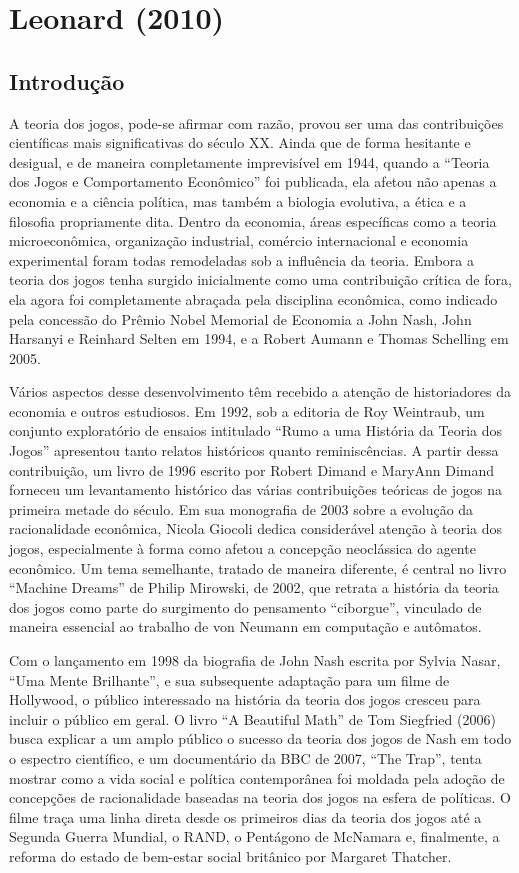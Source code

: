 \documentclass[a4paper,12pt]{article}[abntex2]
\begin{document}
\section{\textbf{Leonard (2010)}}

\subsection{\textbf{Introdução}}
A teoria dos jogos, pode-se afirmar com razão, provou ser uma das contribuições científicas mais significativas do século XX. Ainda que de forma hesitante e desigual, e de maneira completamente imprevisível em 1944, quando a “Teoria dos Jogos e Comportamento Econômico” foi publicada, ela afetou não apenas a economia e a ciência política, mas também a biologia evolutiva, a ética e a filosofia propriamente dita. Dentro da economia, áreas específicas como a teoria microeconômica, organização industrial, comércio internacional e economia experimental foram todas remodeladas sob a influência da teoria. Embora a teoria dos jogos tenha surgido inicialmente como uma contribuição crítica de fora, ela agora foi completamente abraçada pela disciplina econômica, como indicado pela concessão do Prêmio Nobel Memorial de Economia a John Nash, John Harsanyi e Reinhard Selten em 1994, e a Robert Aumann e Thomas Schelling em 2005.

Vários aspectos desse desenvolvimento têm recebido a atenção de historiadores da economia e outros estudiosos. Em 1992, sob a editoria de Roy Weintraub, um conjunto exploratório de ensaios intitulado “Rumo a uma História da Teoria dos Jogos” apresentou tanto relatos históricos quanto reminiscências. A partir dessa contribuição, um livro de 1996 escrito por Robert Dimand e MaryAnn Dimand forneceu um levantamento histórico das várias contribuições teóricas de jogos na primeira metade do século. Em sua monografia de 2003 sobre a evolução da racionalidade econômica, Nicola Giocoli dedica considerável atenção à teoria dos jogos, especialmente à forma como afetou a concepção neoclássica do agente econômico. Um tema semelhante, tratado de maneira diferente, é central no livro “Machine Dreams” de Philip Mirowski, de 2002, que retrata a história da teoria dos jogos como parte do surgimento do pensamento “ciborgue”, vinculado de maneira essencial ao trabalho de von Neumann em computação e autômatos.

Com o lançamento em 1998 da biografia de John Nash escrita por Sylvia Nasar, “Uma Mente Brilhante”, e sua subsequente adaptação para um filme de Hollywood, o público interessado na história da teoria dos jogos cresceu para incluir o público em geral. O livro “A Beautiful Math” de Tom Siegfried (2006) busca explicar a um amplo público o sucesso da teoria dos jogos de Nash em todo o espectro científico, e um documentário da BBC de 2007, “The Trap”, tenta mostrar como a vida social e política contemporânea foi moldada pela adoção de concepções de racionalidade baseadas na teoria dos jogos na esfera de políticas. O filme traça uma linha direta desde os primeiros dias da teoria dos jogos até a Segunda Guerra Mundial, o RAND, o Pentágono de McNamara e, finalmente, a reforma do estado de bem-estar social britânico por Margaret Thatcher.
\end{document}
